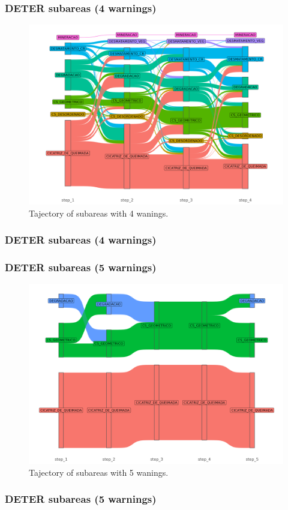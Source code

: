 \documentclass[aspectratio=169]{beamer}
\begin{document}
\begin{frame}
    \frametitle{DETER subareas (4 warnings)}
    \begin{figure}[h] 
        \includegraphics[width=0.65\linewidth]
        {./figures/plot_deter_subarea_trajectory_4.png}
        \caption{Tajectory of subareas with 4 wanings.}
        \label{fig:deter_subarea_trajectory_4}
    \end{figure}
\end{frame}
\begin{frame}[allowframebreaks]
    \frametitle{DETER subareas (4 warnings)}
    
\end{frame}

\begin{frame}
    \frametitle{DETER subareas (5 warnings)}
    \begin{figure}[h] 
        \includegraphics[width=0.65\linewidth]
        {./figures/plot_deter_subarea_trajectory_5.png}
        \caption{Tajectory of subareas with 5 wanings.}
        \label{fig:deter_subarea_trajectory_5}
    \end{figure}
\end{frame}
\begin{frame}[allowframebreaks]
    \frametitle{DETER subareas (5 warnings)}
    
\end{frame}
\end{document}
